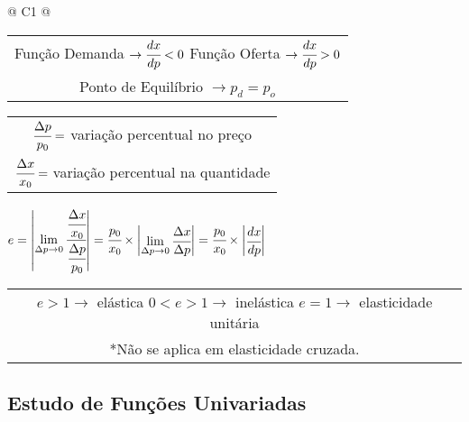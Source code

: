 		\begin{longtable}{
		@{}
		C{1\textwidth} 
		@{}}

			\toprule
			{\large \begin{tabular}[c]{@{}c@{}} Função Demanda $\rightarrow \cfrac{dx}{dp} < 0$ \hspace{1cm} Função Oferta $\rightarrow \cfrac{dx}{dp} > 0$ \\ Ponto de Equilíbrio $\rightarrow p_{d} = p_{o}$ \end{tabular}}
			\tabularnewline
			\midrule
			{\large \begin{tabular}[c]{@{}c@{}} $\cfrac{\Delta p}{p_{0}} =$ variação percentual no preço \\ $\cfrac{\Delta x}{x_{0}} =$ variação percentual na quantidade \end{tabular}}
			\tabularnewline
			\midrule
			{\large $e = \begin{vmatrix} \lim \limits_{\Delta p \to 0} \cfrac{\cfrac{\Delta x}{x_{0}}}{\cfrac{\Delta p}{p_{0}}} \end{vmatrix} = \cfrac{p_{0}}{x_{0}} \times \begin{vmatrix} \lim \limits_{\Delta p \to 0} \cfrac{\Delta x}{\Delta p}\end{vmatrix} = \cfrac{p_{0}}{x_{0}} \times \begin{vmatrix} \cfrac{dx}{dp}\end{vmatrix}$}
			\tabularnewline
			\midrule
			{\large \begin{tabular}[c]{@{}c@{}}
			
			$e > 1 \rightarrow$ elástica \hspace{0.5cm} $0 < e > 1 \rightarrow$ inelástica \hspace{0.5cm} $e = 1 \rightarrow$ elasticidade unitária \\
			
			*Não se aplica em elasticidade cruzada.
			
			\end{tabular}}
			\tabularnewline
			\bottomrule

		\end{longtable}

	\subsection{Estudo de Funções Univariadas}


